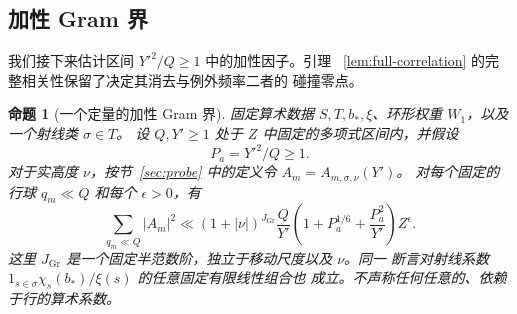\documentclass[11pt,a4paper]{article}
\numberwithin{equation}{section}
\numberwithin{figure}{section}
\newtheorem{proposition}[theorem]{命题}
\theoremstyle{definition}
\theoremstyle{remark}
\begin{document}
\subsection{加性 Gram 界}

我们接下来估计区间 $Y'^2/Q\ge1$ 中的加性因子。引理
~\ref{lem:full-correlation} 的完整相关性保留了决定其消去与例外频率二者的
碰撞零点。

\begin{proposition}[一个定量的加性 Gram 界]\label{prop:probe-gram}
固定算术数据 $S,T,b_*,\xi$、环形权重 $W_1$，以及一个射线类 $\sigma\in T$。
设 $Q,Y'\ge1$ 处于 $Z$ 中固定的多项式区间内，并假设
\[
 P_a=Y'^2/Q\ge1.
\]
对于实高度 $\nu$，按节~\ref{sec:probe} 中的定义令 $A_m=A_{m,\sigma,\nu}(Y')$。
对每个固定的行球 $q_m\ll Q$ 和每个 $\epsilon>0$，有
\begin{equation}
 \sum_{q_m\ll Q}|A_m|^2
 \ll (1+|\nu|)^{J_{\mathrm{Gr}}}\frac Q{Y'}
       \left(1+P_a^{1/6}+\frac{P_a^2}{Y'}\right)Z^\epsilon.
 \label{eq:gram-quantitative}
\end{equation}
这里 $J_{\mathrm{Gr}}$ 是一个固定半范数阶，独立于移动尺度以及 $\nu$。同一
断言对射线系数 $1_{s\in\sigma}\chi_s(b_*)/\xi(s)$ 的任意固定有限线性组合也
成立。不声称任何任意的、依赖于行的算术系数。
\end{proposition}
\end{document}
